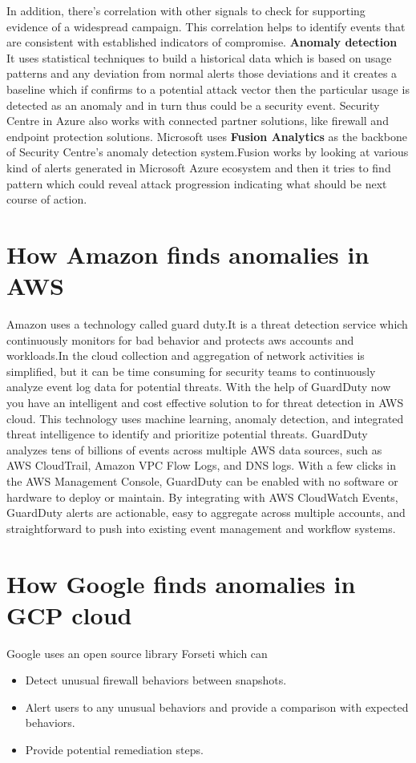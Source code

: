 In addition, there's correlation with other signals to check for supporting evidence of a widespread campaign. This correlation helps to identify events that are consistent with established indicators of compromise.\newline \newline
\textbf{Anomaly detection}\\It uses statistical techniques to build a historical data which is based on usage patterns and any deviation from normal alerts those deviations and it creates a baseline which if confirms to a potential attack vector then the particular usage is detected as an anomaly and in turn thus could be a security event.\newline\newline
Security Centre in Azure also works with connected partner solutions, like firewall and endpoint protection solutions. Microsoft uses \textbf{Fusion Analytics} \cite{mslinks2} as the backbone of Security Centre's anomaly detection system.Fusion works by looking at various kind of alerts generated in Microsoft Azure ecosystem and then it tries to find  pattern which could reveal attack progression indicating what should be next course of action.
\section{How Amazon finds anomalies in AWS}
Amazon uses a technology called guard duty\cite{amazon2}.It is a threat detection service which continuously monitors for bad behavior and protects aws accounts and workloads.In the cloud collection and aggregation of  network activities is simplified, but it can be time consuming for security teams to continuously analyze event log data for potential threats. With the help of GuardDuty now you have an intelligent and cost effective solution to for threat detection in AWS cloud. This technology uses machine learning, anomaly detection, and integrated threat intelligence to identify and prioritize potential threats. GuardDuty analyzes tens of billions of events across multiple AWS data sources, such as AWS CloudTrail, Amazon VPC Flow Logs, and DNS logs. With a few clicks in the AWS Management Console, GuardDuty can be enabled with no software or hardware to deploy or maintain. By integrating with AWS CloudWatch Events, GuardDuty alerts are actionable, easy to aggregate across multiple accounts, and straightforward to push into existing event management and workflow systems.
\section{How Google finds anomalies in GCP cloud }
Google uses an open source library Forseti\cite{google31} which can\\
\begin{itemize}
    \item Detect unusual firewall behaviors between snapshots.
    \item Alert users to any unusual behaviors and provide a comparison with expected behaviors.
    \item Provide potential remediation steps.
\end{itemize}

